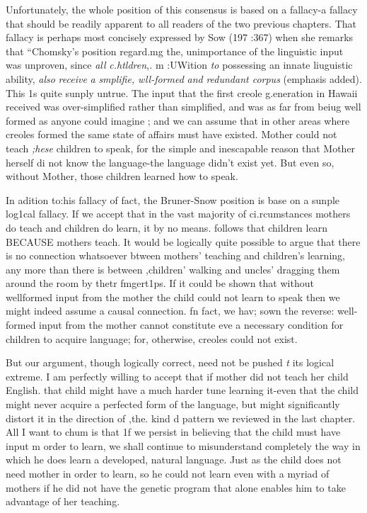 Unfortunately, the whole position of this consensus is based on a fallacy-a fallacy that should be readily apparent to all readers of the two previous chapters. That fallacy is perhaps most concisely expressed
by Sow (197 :367) when she remarks that ``Chomsky's position regard.mg the, unimportance of the linguistic input was unproven, since \textit{all} \textit{c}\textit{.}\textit{htldren},\textit{.} m :UWition \textit{to} possessing an innate liuguistic ability, \textit{also} \textit{receive} \textit{a} \textit{smplifie,} \textit{wll-formed} \textit{and} \textit{redundant corpus{\textquotedbl}} (emphasis added). This 1s quite sunply untrue. The input that the first creole g.eneration in Hawaii received was over-simplified rather than simpli\-fied, and was as far from beiug well formed as anyone could imagine ;
and we can assume that in other areas where creoles formed the same state of affairs must have existed. Mother could not teach \textit{;}\textit{hese} children to speak, for the simple and inescapable reason that Mother herself di not know the language-the language didn't exist yet. But even so, without Mother, those children learned how to speak.

In adition to:his fallacy of fact, the Bruner-Snow position is base on a sunple log1cal fallacy. If we accept that in the vast majority of ci.rcumstances mothers do teach and children do learn, it by no means. follows that children learn BECAUSE mothers teach. It would be logically quite possible to argue that there is no connection whatso\-ever btween mothers' teaching and children's learning, any more than there is between ,children' walking and uncles' dragging them around the room by thetr fmgert1ps. If it could be shown that without well\-formed input from the mother the child could not learn to speak then we might indeed assume a causal connection. fn fact, we hav; sown the reverse: well-formed input from the mother cannot constitute eve a necessary condition for children to acquire language; for, otherwise, creoles could not exist.

But our argument, though logically correct, need not be pushed \textit{t} its logical extreme. I am perfectly willing to accept that if mother did not teach her child English. that child might have a much harder tune learning it-even that the child might never acquire a perfected form of the language, but might significantly distort it in the direction of ,the. kind d pattern we reviewed in the last chapter. All I want to chum is that 1f we persist in believing that the child must have input m order to learn, we shall continue to misunderstand completely the way in which he does learn a developed, natural language. Just as
the child does not need mother in order to learn, so he could not learn even with a myriad of mothers if he did not have the genetic program that alone enables him to take advantage of her teaching.

